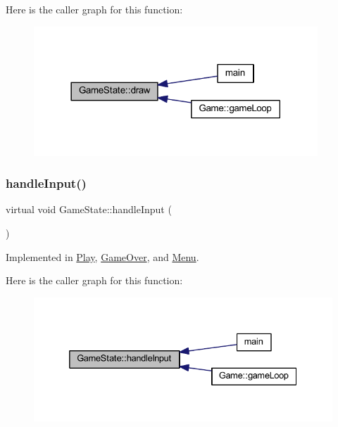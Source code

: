 Here is the caller graph for this function\+:
\nopagebreak
\begin{figure}[H]
\begin{center}
\leavevmode
\includegraphics[width=302pt]{class_game_state_ac872d748df12ac36d7a42a191997e4f7_icgraph}
\end{center}
\end{figure}
\mbox{\label{class_game_state_a970b55edd5a1da31ea0f7113e2c1f85a}} 
\subsubsection{\texorpdfstring{handle\+Input()}{handleInput()}}
{\footnotesize\ttfamily virtual void Game\+State\+::handle\+Input (\begin{DoxyParamCaption}{ }\end{DoxyParamCaption})\hspace{0.3cm}{\ttfamily [pure virtual]}}



Implemented in \hyperlink{class_play_a81bdbd1ef7b3de50dba1a8ebf346a1fc}{Play}, \hyperlink{class_game_over_acec786fec9ee289c9fab95b3b067efd0}{Game\+Over}, and \hyperlink{class_menu_a28296c3978c880ea9288fc97a869795d}{Menu}.

Here is the caller graph for this function\+:
\nopagebreak
\begin{figure}[H]
\begin{center}
\leavevmode
\includegraphics[width=332pt]{class_game_state_a970b55edd5a1da31ea0f7113e2c1f85a_icgraph}
\end{center}
\end{figure}
\mbox{\label{class_game_state_ab2864bfa04f92f6966861a1f2883bda0}} 
